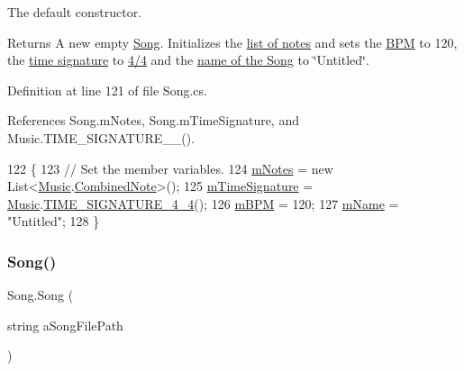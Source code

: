 The default constructor. 

\begin{DoxyReturn}{Returns}
A new empty \hyperlink{class_song}{Song}. Initializes the \hyperlink{group___song_priv_var_ga674bc904a1f856d485d5fb7fe84bac85}{list of notes} and sets the \hyperlink{group___song_priv_var_ga3341fbbd9c0c58fe6514623e6b6c5a1e}{B\+PM} to 120, the \hyperlink{group___music_structs_struct_music_1_1_time_signature}{time signature} to \hyperlink{group___music_stat_func_gac95af323eef7511543c799154e1c29fd}{4/4} and the \hyperlink{group___song_priv_var_ga6a5e6c1e4aa92939e2b5c1e3d9908df8}{name of the Song} to \char`\"{}\+Untitled\char`\"{}. 
\end{DoxyReturn}


Definition at line 121 of file Song.\+cs.



References Song.\+m\+Notes, Song.\+m\+Time\+Signature, and Music.\+T\+I\+M\+E\+\_\+\+S\+I\+G\+N\+A\+T\+U\+R\+E\+\_\+\_().


\begin{DoxyCode}
122     \{
123         \textcolor{comment}{// Set the member variables.}
124         \hyperlink{group___song_priv_var_ga674bc904a1f856d485d5fb7fe84bac85}{mNotes} = \textcolor{keyword}{new} List<\hyperlink{class_music}{Music}.\hyperlink{group___music_structs_struct_music_1_1_combined_note}{CombinedNote}>();
125         \hyperlink{group___song_priv_var_ga2b2dcc0e83e49f7303b6a1371877b25e}{mTimeSignature} = \hyperlink{class_music}{Music}.\hyperlink{group___music_stat_func_gac95af323eef7511543c799154e1c29fd}{TIME\_SIGNATURE\_4\_4}();
126         \hyperlink{group___song_priv_var_ga3341fbbd9c0c58fe6514623e6b6c5a1e}{mBPM} = 120;
127         \hyperlink{group___song_priv_var_ga6a5e6c1e4aa92939e2b5c1e3d9908df8}{mName} = \textcolor{stringliteral}{"Untitled"};
128     \}
\end{DoxyCode}
\mbox{\label{group___song_construct_ga157b9e8a0ca714707c2bf58bed5ebf4c}} 
\subsubsection{\texorpdfstring{Song()}{Song()}\hspace{0.1cm}{\footnotesize\ttfamily [2/2]}}
{\footnotesize\ttfamily Song.\+Song (\begin{DoxyParamCaption}\item[{string}]{a\+Song\+File\+Path }\end{DoxyParamCaption})}



